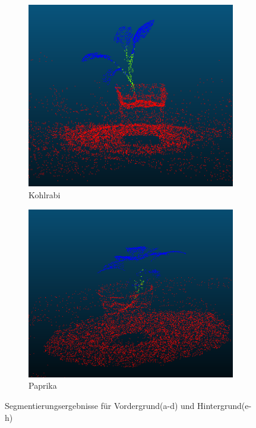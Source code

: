 \documentclass[12pt,titlepage, twoside]{article}
\begin{document}
\begin{figure}[htb]
\begin{subfigure}{0.24\textwidth}
  \includegraphics[width=\linewidth]{./Images/BG_Kohlrabi.png}
  \caption{Kohlrabi}
  \label{fig:segmentation:compare:7}
\end{subfigure}\hfil 
\begin{subfigure}{0.24\textwidth}
    \includegraphics[width=\linewidth]{./Images/BG_Paprika.png}
    \caption{Paprika}
    \label{fig:segmentation:compare:8}
\end{subfigure}
\caption{Segmentierungsergebnisse für Vordergrund(a-d) und Hintergrund(e-h)}
\label{fig:segmentation:compare}
\end{figure}
\end{document}
